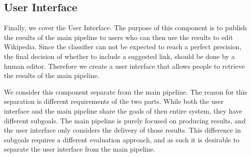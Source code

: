 \subsection{User Interface}

Finally, we cover the User Interface. The purpose of this component is to publish the results of the main pipeline to users who can then use the results to edit Wikipedia. Since the classifier can not be expected to reach a perfect precision, the final decision of whether to include a suggested link, should be done by a human editor. Therefore we create a user interface that allows people to retrieve the results of the main pipeline.

We consider this component separate from the main pipeline. The reason for this separation is different requirements of the two parts. While both the user interface and the main pipeline share the goals of then entire system, they have different subgoals. The main pipeline is purely focused on producing results, and the user interface only considers the delivery of those results. This difference in subgoals requires a different evaluation approach, and as such it is desirable to separate the user interface from the main pipeline.










